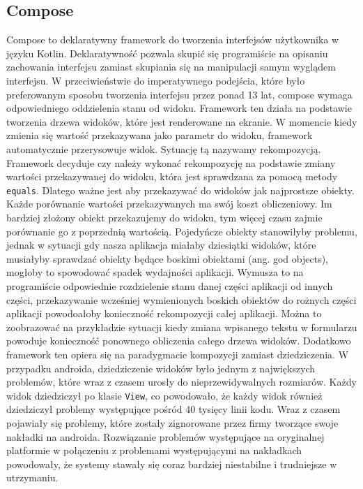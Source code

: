 \subsection{Compose}\label{app:used_technologies:compose}
Compose to deklaratywny framework do tworzenia interfejsów użytkownika w języku Kotlin.
Deklaratywność pozwala skupić się programiście na opisaniu zachowania interfejsu zamiast skupiania się na manipulacji samym wyglądem interfejsu.
W przeciwieństwie do imperatywnego podejścia, które było preferowanym sposobu tworzenia interfejsu przez ponad 13 lat, compose wymaga odpowiedniego oddzielenia stanu od widoku.
Framework ten działa na podstawie tworzenia drzewa widoków, które jest renderowane na ekranie.
\cite{composeTree}
W momencie kiedy zmienia się wartość przekazywana jako parametr do widoku, framework automatycznie przerysowuje widok.
Sytuację tą nazywamy rekompozycją.
\cite{composeRecomposition}
Framework decyduje czy należy wykonać rekompozycję na podstawie zmiany wartości przekazywanej do widoku, która jest sprawdzana za pomocą metody \texttt{equals}.
Dlatego ważne jest aby przekazywać do widoków jak najprostsze obiekty.
Każde porównanie wartości przekazywanych ma swój koszt obliczeniowy.
Im bardziej złożony obiekt przekazujemy do widoku, tym więcej czasu zajmie porównanie go z poprzednią wartością.
Pojedyńcze obiekty stanowiłyby problemu, jednak w sytuacji gdy nasza aplikacja miałaby dziesiątki widoków, które musiałyby sprawdzać obiekty będące boskimi obiektami (ang. god objects), mogłoby to spowodować spadek wydajności aplikacji.
\cite{godObjectWikipedia}
Wymusza to na programiście odpowiednie rozdzielenie stanu danej części aplikacji od innych części, przekazywanie wcześniej wymienionych boskich obiektów do rożnych części aplikacji powodoałoby konieczność rekompozycji całej aplikacji.
Można to zoobrazować na przykładzie sytuacji kiedy zmiana wpisanego tekstu w formularzu powoduje konieczność ponownego obliczenia całego drzewa widoków.
Dodatkowo framework ten opiera się na paradygmacie kompozycji zamiast dziedziczenia.
W przypadku androida, dziedziczenie widoków było jednym z największych problemów, które wraz z czasem urosły do nieprzewidywalnych rozmiarów.
Każdy widok dziedziczył po klasie \texttt{View}, co powodowało, że każdy widok również dziedziczył problemy występujące pośród 40 tysięcy linii kodu.
Wraz z czasem pojawiały się problemy, które zostały zignorowane przez firmy tworzące swoje nakładki na androida.
Rozwiązanie problemów występujące na oryginalnej platformie w połączeniu z problemami występującymi na nakładkach powodowały, że systemy stawały się coraz bardziej niestabilne i trudniejsze w utrzymaniu.
